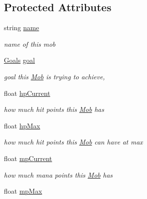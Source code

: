 \subsection*{Protected Attributes}
\begin{DoxyCompactItemize}
\item 
string \hyperlink{class_mob_a1adcb405b2a4647bfb2471b1283b9477}{name}\hypertarget{class_mob_a1adcb405b2a4647bfb2471b1283b9477}{}\label{class_mob_a1adcb405b2a4647bfb2471b1283b9477}

\begin{DoxyCompactList}\small\item\em name of this mob \end{DoxyCompactList}\item 
\hyperlink{class_mob_a886346a9f913203df0797f2c84dd8962}{Goals} \hyperlink{class_mob_ad6c2e1b70a39551fd39b25002dac55b1}{goal}
\begin{DoxyCompactList}\small\item\em goal this \hyperlink{class_mob}{Mob} is trying to achieve, \end{DoxyCompactList}\item 
float \hyperlink{class_mob_a5a84c7649f3774da15780caa9f21aabc}{hp\+Current}\hypertarget{class_mob_a5a84c7649f3774da15780caa9f21aabc}{}\label{class_mob_a5a84c7649f3774da15780caa9f21aabc}

\begin{DoxyCompactList}\small\item\em how much hit points this \hyperlink{class_mob}{Mob} has \end{DoxyCompactList}\item 
float \hyperlink{class_mob_ac2a881584e2fa3224da656a775f17284}{hp\+Max}\hypertarget{class_mob_ac2a881584e2fa3224da656a775f17284}{}\label{class_mob_ac2a881584e2fa3224da656a775f17284}

\begin{DoxyCompactList}\small\item\em how much hit points this \hyperlink{class_mob}{Mob} can have at max \end{DoxyCompactList}\item 
float \hyperlink{class_mob_ae1388056fe541060e8c1607ae561801f}{mp\+Current}\hypertarget{class_mob_ae1388056fe541060e8c1607ae561801f}{}\label{class_mob_ae1388056fe541060e8c1607ae561801f}

\begin{DoxyCompactList}\small\item\em how much mana points this \hyperlink{class_mob}{Mob} has \end{DoxyCompactList}\item 
float \hyperlink{class_mob_a8156e952a713baa462990ce635bf9ae8}{mp\+Max}\hypertarget{class_mob_a8156e952a713baa462990ce635bf9ae8}{}\label{class_mob_a8156e952a713baa462990ce635bf9ae8}


\end{DoxyCompactItemize}
